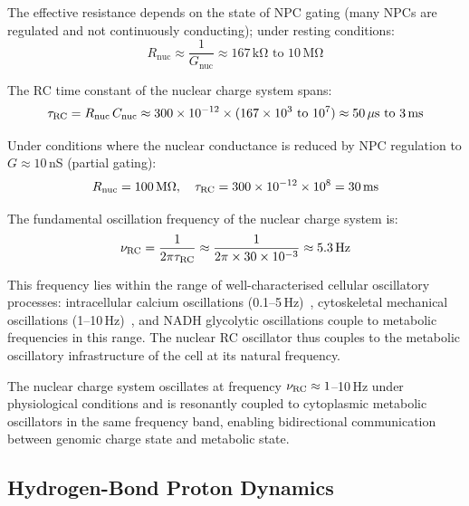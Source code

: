 The effective resistance depends on the state of NPC gating (many NPCs are regulated and not continuously conducting); under resting conditions:
\begin{equation}
  R_{\mathrm{nuc}} \approx \frac{1}{G_{\mathrm{nuc}}} \approx 167\,\mathrm{k\Omega} \text{ to } 10\,\mathrm{M\Omega}
\end{equation}

The RC time constant of the nuclear charge system spans:
\begin{equation}
  \tau_{\mathrm{RC}} = R_{\mathrm{nuc}} \, C_{\mathrm{nuc}} \approx 300 \times 10^{-12} \times (167 \times 10^{3} \text{ to } 10^7) \approx 50\,\mu\mathrm{s} \text{ to } 3\,\mathrm{ms}
  \label{v:eq:tau_RC}
\end{equation}

Under conditions where the nuclear conductance is reduced by NPC regulation to $G \approx 10$\,nS (partial gating):
\begin{equation}
  R_{\mathrm{nuc}} = 100\,\mathrm{M\Omega}, \quad \tau_{\mathrm{RC}} = 300 \times 10^{-12} \times 10^8 = 30\,\mathrm{ms}
\end{equation}

The fundamental oscillation frequency of the nuclear charge system is:
\begin{equation}
  \nu_{\mathrm{RC}} = \frac{1}{2\pi \tau_{\mathrm{RC}}} \approx \frac{1}{2\pi \times 30 \times 10^{-3}} \approx 5.3\,\mathrm{Hz}
  \label{v:eq:nu_RC}
\end{equation}

This frequency lies within the range of well-characterised cellular oscillatory processes: intracellular calcium oscillations (0.1--5\,Hz)~\cite{Berridge1997}, cytoskeletal mechanical oscillations (1--10\,Hz)~\cite{Frey2006}, and NADH glycolytic oscillations couple to metabolic frequencies in this range. The nuclear RC oscillator thus couples to the metabolic oscillatory infrastructure of the cell at its natural frequency.

\begin{proposition}
The nuclear charge system oscillates at frequency $\nu_{\mathrm{RC}} \approx 1$--10\,Hz under physiological conditions and is resonantly coupled to cytoplasmic metabolic oscillators in the same frequency band, enabling bidirectional communication between genomic charge state and metabolic state.
\label{v:prop:coupling}
\end{proposition}

\subsection{Hydrogen-Bond Proton Dynamics}

